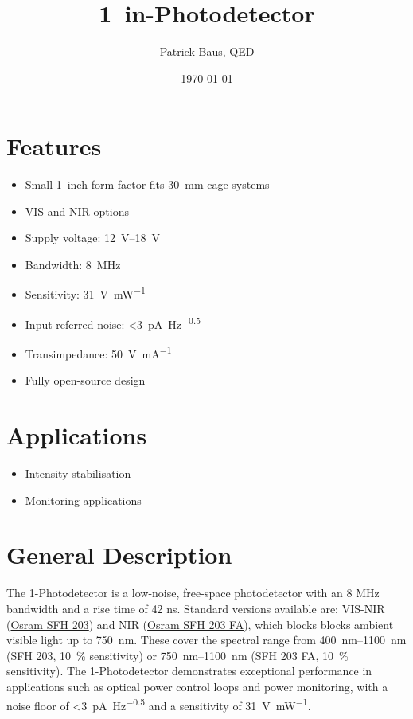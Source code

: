\documentclass[fontsize=10pt]{datasheet}
\title{\qty{1}{in}-Photodetector}
\author{Patrick Baus, QED}
\date{\today}
\begin{document}
\maketitle

\section*{Features}

\begin{itemize}
\item{Small \qty{1}{inch} form factor fits \qty{30}{\mm} cage systems}
\item{VIS and NIR options}
\item{Supply voltage: \qtyrange{12}{18}{\V}}
\item{Bandwidth: \qty{8}{\MHz}}
\item{Sensitivity: \qty{31}{\V \per \mW}}
\item{Input referred noise: \qty{<3}{\pA \per \Hz\tothe{0.5}}}
\item{Transimpedance: \qty{50}{\V \per \mA}}
\item{Fully open-source design}
\end{itemize}

\section*{Applications}

\begin{itemize}
\item{Intensity stabilisation}
\item{Monitoring applications}
\end{itemize}

\section*{General Description}
The \qty{1}{\inch}-Photodetector is a low-noise, free-space photodetector with an 8 MHz bandwidth and a rise time of 42 ns. Standard versions available are: VIS-NIR (\href{https://ams-osram.com/products/photodetectors/photodiodes/osram-radial-t1-34-sfh-203}{Osram SFH 203}) and NIR (\href{https://ams-osram.com/products/photodetectors/photodiodes/osram-radial-t1-34-sfh-203-fa}{Osram SFH 203 FA}), which blocks blocks ambient visible light up to \qty{750}{\nm}. These cover the spectral range from \qtyrange{400}{1100}{\nm} (SFH 203, \qty{10}{\percent} sensitivity) or \qtyrange{750}{1100}{\nm}  (SFH 203 FA, \qty{10}{\percent} sensitivity). The \qty{1}{\inch}-Photodetector demonstrates exceptional performance in applications such as optical power control loops and power monitoring, with a noise floor of \qty{<3}{\pA \per \Hz\tothe{0.5}} and a sensitivity of \qty{31}{\V \per \mW}.
\end{document}
